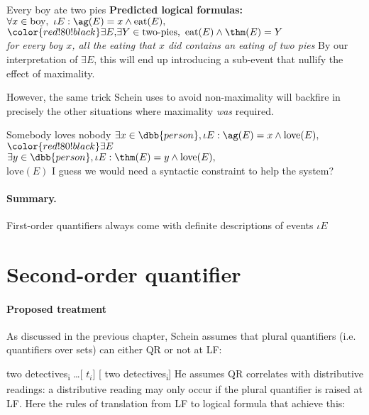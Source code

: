 \pex
\a Every boy ate two pies
\a 
\textbf{Predicted logical formulas:}\\
$
\forall x\in \text{boy},\ \iota E: \ag(E) = x \wedge \text{eat}(E),$\\
${\color{red!80!black}\exists E,} \exists Y\in \text{two-pies},\ \text{eat}(E) \wedge \thm(E) = Y$\\
\emph{
for every boy $x$,
all the eating that $x$ did {\color{red!80!black} contains} an eating of two pies
}
\xe
%
By our interpretation of $\exists E$, this will end up introducing a sub-event that nullify the effect of maximality.

However, the same trick Schein uses to avoid non-maximality will backfire in precisely the other situations where maximality \emph{was} required.

\pex
\a
Somebody loves nobody
\a
$\exists x\in\dbb{person},\iota E : \ag(E) = x \wedge \text{love}(E),$\\
$\color{red!80!black} \exists E$\\
\ljudge{$\neg$}$\exists y\in \dbb{person}, \iota E : \thm(E) = y \wedge \text{love}(E),$\\
$\text{love}(E)$
\a 
\xe
%
I guess we would need a syntactic constraint to help the system?

\paragraph{Summary.} First-order quantifiers always come with definite descriptions of events $\iota E$

\section{Second-order quantifier}

\paragraph{Proposed treatment}
As discussed in the previous chapter, Schein assumes that plural quantifiers (i.e. quantifiers over sets) can either QR or not at LF:

\pex
\a 
two detectives\textsubscript{i} \ldots [\thm{} $t_i$]
\a{} 
[\thm{} two detectives\textsubscript{i}]
\xe
%
He assumes QR correlates with distributive readings: a distributive reading may only occur if the plural quantifier is raised at LF. Here the rules of translation from LF to logical formula that achieve this:

